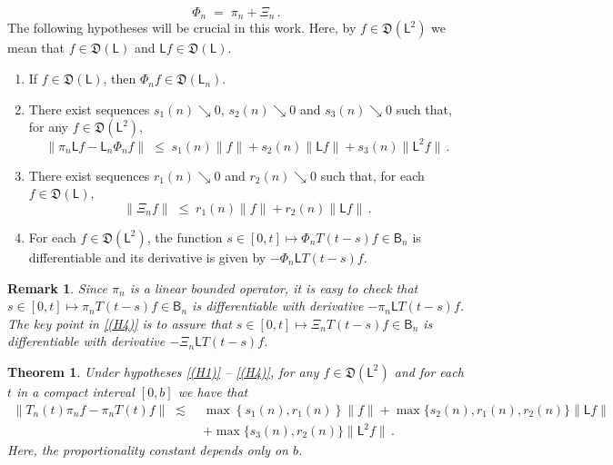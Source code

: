 \documentclass[10pt,a4paper]{amsart}
\newtheorem{remark}{Remark}
\newtheorem{theorem}{Theorem}
\newcommand{\mf}[1]{{\mathfrak #1}}
\newcommand{\msf}[1]{{\mathsf #1}}
\newcommand{\norm}[1]{\lVert#1\rVert}
\begin{document}
	\begin{equation}\label{eq:A}
		\Phi_n \;=\; \pi_n + \Xi_n\,.
	\end{equation}
	The following hypotheses will be crucial in this work. Here, by $f \in \mf{D}(\msf{L}^2)$ we mean that $f \in \mf{D}(\msf{L})$ and $\msf{L}f \in \mf{D}(\msf{L})$.
	\begin{enumerate}[label=(H\arabic*)]
		\item \label{(H1)} If $f\in \mf{D}(\msf{L})$, then $\Phi_nf\in\mf D(\msf{L_n})$.
		\item \label{(H2)} There exist sequences $s_1(n)\searrow0$, $s_2(n)\searrow0$ and $s_3(n)\searrow 0$ such that, for any $f\in\mf{D}(\msf{L}^2)$,
		\begin{equation*}
			\norm{\pi_n\msf{L}f-\msf{L}_n\Phi_nf}\;\leq\;s_1(n)\norm{f}+s_2(n)\norm{\msf{L}f}+s_3(n)\norm{\msf{L}^{2}f}\,.
		\end{equation*}
		\item \label{(H3)} There exist sequences $r_1(n)\searrow0$ and $r_2(n)\searrow0$ such that, for each $f\in\mf{D}(\msf{L})$,
		\begin{equation*}
			\norm{\Xi_nf}\;\leq\;r_1(n)\norm{f} +r_2(n)\norm{\msf{L}f}\,.
		\end{equation*}
		\item \label{(H4)} For each $f\in \mf{D}(\msf{L}^2)$, the function $s \in [0,t] \mapsto \Phi_n T(t-s)f\in \msf{B}_n$ is differentiable and its derivative is given by $-\Phi_n \msf{L} T(t-s) f$.
	\end{enumerate}
	\begin{remark}\label{rmk21}
		Since $\pi_n$ is a linear bounded operator, it is easy to check that   $s \in [0,t] \mapsto \pi_n T(t-s)f\in \msf{B}_n$ is differentiable with derivative  $-\pi_n \msf{L}T(t-s) f$. The key point in \ref{(H4)} is to assure that    $s \in [0,t] \mapsto \Xi_n T(t-s)f\in \msf{B}_n$ is differentiable with derivative  $-\Xi_n \msf{L} T(t-s) f$.
	\end{remark}

	\begin{theorem}\label{thm21}
		Under hypotheses  \ref{(H1)} -- \ref{(H4)}, for any $f \in \mf{D}(\msf{L}^2)$ and for each $t$ in a compact interval $[0,b]$ we have that
		\begin{align*}%
			\norm{{T}_n(t)\pi_nf - \pi_nT(t)f}\;\lesssim\; & \max\left\{s_1(n),r_1(n)\right\}\norm{f} +\max\big\{s_2(n),r_1(n),r_2(n)\big\}\norm{\msf{L}f}\\
			&+\max\big\{s_3(n),r_2(n)\big\}\norm{\msf{L}^2f}\,.
		\end{align*}
		Here, the proportionality constant depends only on $b$.
	\end{theorem}
\end{document}
